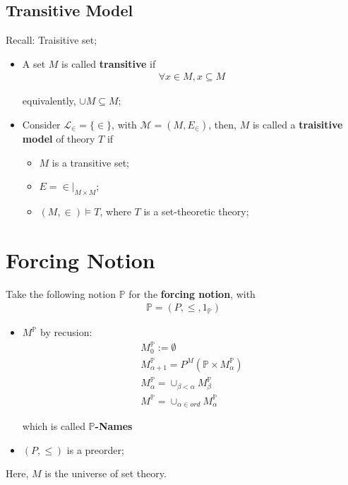 \documentclass[Total.tex]{subfiles}
\begin{document}
			\subsection{Transitive Model}
				\begin{Def}
					Recall: Traisitive set;
					\begin{itemize}
						\item 
						A set $M$ is called \textbf{transitive} if
						\begin{gather*}
							\forall x\in M,x\subseteq M
						\end{gather*}
						
						equivalently, $\cup M\subseteq M$;
						
						\item Consider $\mathcal{L}_\in=\{\in\}$, with $\mathcal{M}=(M,E_\in)$, then, $M$ is called a \textbf{traisitive model} of theory $T$ if
						\begin{itemize}
							\item $M$ is a transitive set;
							\item $E=\in |_{M\times M}$;
							\item $(M,\in)\models T$, where $T$ is a set-theoretic theory;
						\end{itemize}
					\end{itemize}
				\end{Def}
			
			\section{Forcing Notion}
				\begin{Def}
					Take the following notion $\mathbb{P}$ for the \textbf{forcing notion}, with
					\begin{gather*}
						\mathbb{P}=(P,\leq,1_\mathbb{P})
					\end{gather*}
					\begin{itemize}
						\item $M^\mathbb{P}$ by recusion:
						\begin{gather*}
							M_0^\mathbb{P}:=\emptyset\\
							M_{\alpha+1}^\mathbb{P}=P^M(\mathbb{P}\times M_\alpha^\mathbb{P})\\
							M_\alpha^\mathbb{P}=\cup_{\beta<\alpha} M_\beta^\mathbb{P}\\
							M^\mathbb{P}=\cup_{\alpha\in ord} M_\alpha^{\mathbb{P}}
						\end{gather*}
						
						which is called \textbf{$\mathbb{P}$-Names}
						\item $(P,\leq)$ is a preorder;
					\end{itemize}
					
					
					Here, $M$ is the universe of set theory. 
				\end{Def}
			
\end{document}

